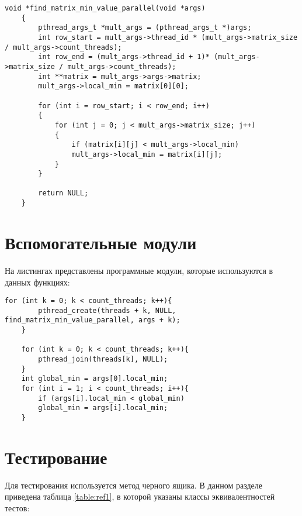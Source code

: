\begin{lstlisting}[label=vinograd_mult,caption=Программный код алгоритма нахождения минимума в матрице (параллельная реализация).]
	void *find_matrix_min_value_parallel(void *args)
	{
		pthread_args_t *mult_args = (pthread_args_t *)args;
		int row_start = mult_args->thread_id * (mult_args->matrix_size / mult_args->count_threads);
		int row_end = (mult_args->thread_id + 1)* (mult_args->matrix_size / mult_args->count_threads);
		int **matrix = mult_args->args->matrix;
		mult_args->local_min = matrix[0][0];
		
		for (int i = row_start; i < row_end; i++)
		{
			for (int j = 0; j < mult_args->matrix_size; j++)
			{
				if (matrix[i][j] < mult_args->local_min)
				mult_args->local_min = matrix[i][j];
			}
		}
		
		return NULL;
	}
\end{lstlisting}

\section{Вспомогательные модули}
На листингах представлены программные модули, которые используются в данных функциях:
\begin{lstlisting}[label=lst:struct_matrix,caption=Программный код класса по работе с матрицами.]	
	for (int k = 0; k < count_threads; k++){
		pthread_create(threads + k, NULL, find_matrix_min_value_parallel, args + k);
	}
	
	for (int k = 0; k < count_threads; k++){
		pthread_join(threads[k], NULL);
	}
	int global_min = args[0].local_min;
	for (int i = 1; i < count_threads; i++){
		if (args[i].local_min < global_min)
		global_min = args[i].local_min;
	}
\end{lstlisting}

\section{Тестирование}
Для тестирования используется метод черного ящика. В данном разделе приведена таблица \ref{table:ref1}, в которой указаны классы эквивалентностей тестов: \\

